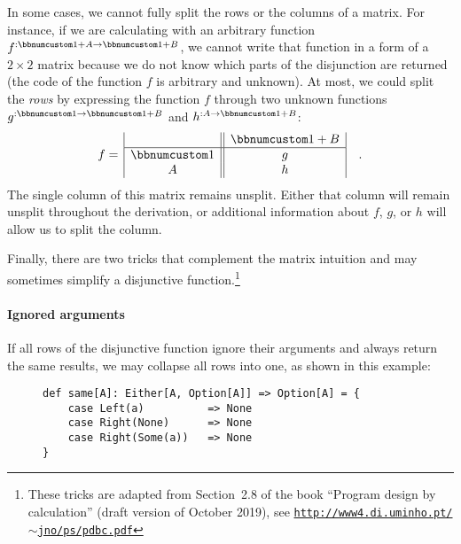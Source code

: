 In some cases, we cannot fully split the rows or the columns of a
matrix. For instance, if we are calculating with an arbitrary function
$f^{:\bbnum 1+A\rightarrow\bbnum 1+B}$, we cannot write that function
in a form of a $2\times2$ matrix because we do not know which parts
of the disjunction are returned (the code of the function $f$ is
arbitrary and unknown). At most, we could split the \emph{rows} by
expressing the function $f$ through two unknown functions $g^{:\bbnum 1\rightarrow\bbnum 1+B}$
and $h^{:A\rightarrow\bbnum 1+B}$:
\[
f=\,\begin{array}{|c||c|}
 & \bbnum 1+B\\
\hline \bbnum 1 & g\\
A & h
\end{array}\quad.
\]
The single column of this matrix remains unsplit. Either that column
will remain unsplit throughout the derivation, or additional information
about $f$, $g$, or $h$ will allow us to split the column.

Finally, there are two tricks that complement the matrix intuition
and may sometimes simplify a disjunctive function.\footnote{These tricks are adapted from Section~2.8 of the book \textsf{``}Program
design by calculation\textsf{''} (draft version of October 2019), see \texttt{\href{http://www4.di.uminho.pt/~jno/ps/pdbc.pdf}{http://www4.di.uminho.pt/$\sim$jno/ps/pdbc.pdf}}}

\paragraph{Ignored arguments}

If all rows of the disjunctive function ignore their arguments and
always return the same results, we may collapse all rows into one,
as shown in this example:

\begin{wrapfigure}{L}{0.5\columnwidth}%
\vspace{-0.2\baselineskip}
\begin{lstlisting}
def same[A]: Either[A, Option[A]] => Option[A] = {
    case Left(a)          => None
    case Right(None)      => None
    case Right(Some(a))   => None
}
\end{lstlisting}
\vspace{-3\baselineskip}
\end{wrapfigure}%

